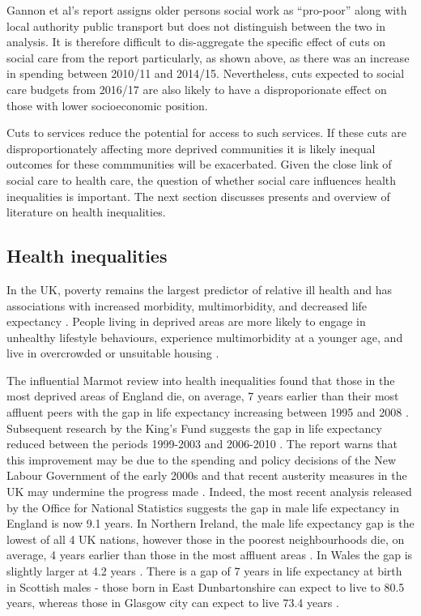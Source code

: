 \documentclass[12pt,]{report}
\begin{document}
Gannon et al's report \citeyearpar{RN235} assigns older persons social
work as ``pro-poor'' along with local authority public transport but
does not distinguish between the two in analysis. It is therefore
difficult to dis-aggregate the specific effect of cuts on social care
from the report particularly, as shown above, as there was an increase
in spending between 2010/11 and 2014/15. Nevertheless, cuts expected to
social care budgets from 2016/17 \citep{RN447} are also likely to have a
disproporionate effect on those with lower socioeconomic position.

Cuts to services reduce the potential for access to such services. If
these cuts are disproportionately affecting more deprived communities it
is likely inequal outcomes for these commmunities will be exacerbated.
Given the close link of social care to health care, the question of
whether social care influences health inequalities is important. The
next section discusses presents and overview of literature on health
inequalities.

\subsection{Health inequalities}\label{subsec:health-inequals}

In the UK, poverty remains the largest predictor of relative ill health
and has associations with increased morbidity, multimorbidity, and
decreased life expectancy \citep{RN37}. People living in deprived areas
are more likely to engage in unhealthy lifestyle behaviours, experience
multimorbidity at a younger age, and live in overcrowded or unsuitable
housing \citep{RN37, RN311}.

The influential Marmot review into health inequalities found that those
in the most deprived areas of England die, on average, 7 years earlier
than their most affluent peers \citep{RN312} with the gap in life
expectancy increasing between 1995 and 2008 \citep{RN313}. Subsequent
research by the King's Fund suggests the gap in life expectancy reduced
between the periods 1999-2003 and 2006-2010 \citep{RN314}. The report
warns that this improvement may be due to the spending and policy
decisions of the New Labour Government of the early 2000s and that
recent austerity measures in the UK may undermine the progress made
\citep{RN314}. Indeed, the most recent analysis released by the Office
for National Statistics \citeyearpar{RN375} suggests the gap in male
life expectancy in England is now 9.1 years. In Northern Ireland, the
male life expectancy gap is the lowest of all 4 UK nations, however
those in the poorest neighbourhoods die, on average, 4 years earlier
than those in the most affluent areas \citep{RN375}. In Wales the gap is
slightly larger at 4.2 years \citep{RN375}. There is a gap of 7 years in
life expectancy at birth in Scottish males - those born in East
Dunbartonshire can expect to live to 80.5 years, whereas those in
Glasgow city can expect to live 73.4 years \citep{RN375}.
\end{document}
